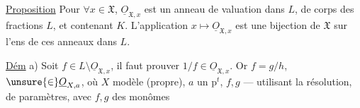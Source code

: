 \margin{$\big|$}
\uline{Proposition} Pour $\forall x\in\mathfrak X$, $\underline{O}_{\mathfrak X,x}$ est un anneau de valuation dans $L$, de corps des fractions $L$, et contenant $K$. L'application $x\longmapsto\underline{O}_{\mathfrak X,x}$ est une bijection de $\mathfrak X$ sur l'ens de ces anneaux dans $L$.

\uline{Dém} a) Soit $f\in L\setminus\underline{O}_{\mathfrak X,x}$, il faut prouver $1/f\in\underline{O}_{\mathfrak X,x}$. Or $f=g/h$, $\unsure{\in}\underline{O}_{X,a}$, où $X$ modèle  (propre), $a$ un p$^t$, $f,g$  --- utilisant la résolution,   de paramètres, avec $f,g$ des monômes
